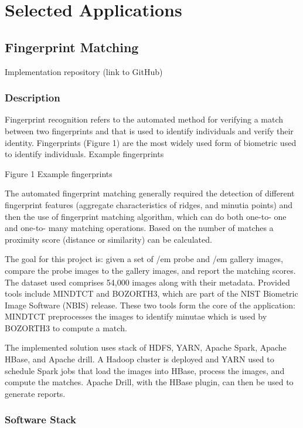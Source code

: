 \documentclass[9pt,twocolumn,twoside]{styles/osajnl}
\begin{document}
\section{Selected Applications}

\subsection{Fingerprint Matching}

Implementation repository (link to GitHub)

\subsubsection{Description}

Fingerprint recognition refers to the automated method for verifying a match between two fingerprints and that is used to identify individuals and verify their identity. Fingerprints (Figure 1) are the most widely used form of biometric used to identify individuals.
 Example fingerprints 

Figure 1 Example fingerprints


The automated fingerprint matching generally required the detection of different fingerprint features (aggregate characteristics of ridges, and minutia points) and then the use of fingerprint matching algorithm, which can do both one-to- one and one-to- many matching operations. Based on the number of matches a proximity score (distance or similarity) can be calculated.


The goal for this project is: given a set of {/em probe} and {/em gallery}
images, compare the probe images to the gallery images, and report the
matching scores.  The dataset used comprises 54,000 images along with
their metadata. Provided tools include MINDTCT and BOZORTH3, which are
part of the NIST Biometric Image Software (NBIS) release. These two
tools form the core of the application: MINDTCT preprocesses the
images to identify minutae which is used by BOZORTH3 to compute a
match.



The implemented solution uses stack of HDFS, YARN, Apache Spark, Apache HBase, and Apache drill. A Hadoop cluster is deployed and YARN used to schedule Spark jobs that load the images into HBase, process the images, and compute the matches. Apache Drill, with the HBase plugin, can then be used to generate reports.

\subsubsection{Software Stack}
\end{document}

